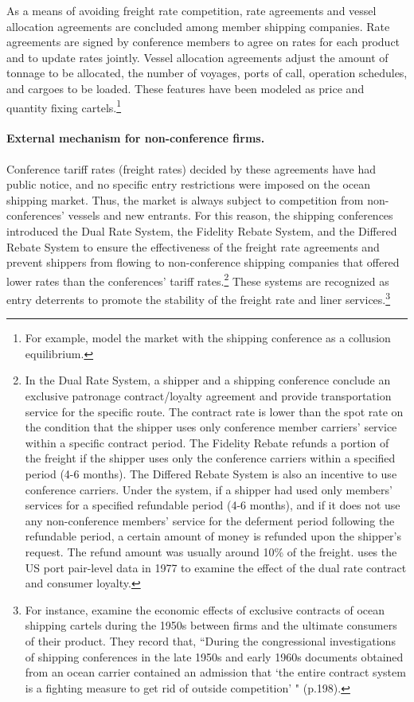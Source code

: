 \documentclass[11pt]{article}
\begin{document}
As a means of avoiding freight rate competition, rate agreements and vessel allocation agreements are concluded among member shipping companies. Rate agreements are signed by conference members to agree on rates for each product and to update rates jointly. Vessel allocation agreements adjust the amount of tonnage to be allocated, the number of voyages, ports of call, operation schedules, and cargoes to be loaded. These features have been modeled as price and quantity fixing cartels.\footnote{For example, \cite{clyde1998market} model the market with the shipping conference as a collusion equilibrium.}

\paragraph{External mechanism for non-conference firms.}
Conference tariff rates (freight rates) decided by these agreements have had public notice, and no specific entry restrictions were imposed on the ocean shipping market. Thus, the market is always subject to competition from non-conferences' vessels and new entrants. For this reason, the shipping conferences introduced the Dual Rate System, the Fidelity Rebate System, and the Differed Rebate System to ensure the effectiveness of the freight rate agreements and prevent shippers from flowing to non-conference shipping companies that offered lower rates than the conferences' tariff rates.\footnote{In the Dual Rate System, a shipper and a shipping conference conclude an exclusive patronage contract/loyalty agreement and provide transportation service for the specific route. The contract rate is lower than the spot rate on the condition that the shipper uses only conference member carriers' service within a specific contract period. The Fidelity Rebate refunds a portion of the freight if the shipper uses only the conference carriers within a specified period (4-6 months). The Differed Rebate System is also an incentive to use conference carriers. Under the system, if a shipper had used only members' services for a specified refundable period (4-6 months), and if it does not use any non-conference members' service for the deferment period following the refundable period, a certain amount of money is refunded upon the shipper's request. The refund amount was usually around 10\% of the freight. \cite{fox1992empirical} uses the US port pair-level data in 1977 to examine the effect of the dual rate contract and consumer loyalty.} These systems are recognized as entry deterrents to promote the stability of the freight rate and liner services.\footnote{For instance, \cite{marin2003exclusive} examine the economic effects of exclusive contracts of ocean shipping cartels during the 1950s between firms and the ultimate consumers of their product. They record that, ``During the congressional investigations of shipping conferences in the late 1950s and early 1960s documents obtained from an ocean carrier contained an admission that ‘the entire contract system is a fighting measure to get rid of outside competition' " (p.198).}
\end{document}
